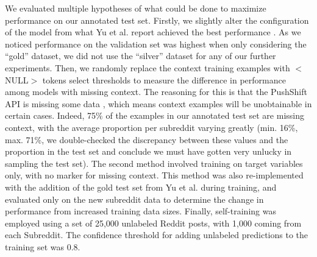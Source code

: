 \documentclass[10pt,twocolumn,letterpaper]{article}
\begin{document}

We evaluated multiple hypotheses of what could be done to maximize performance on our annotated test set. Firstly, we slightly alter the configuration of the model from what Yu et al. report achieved the best performance \cite{yu-etal-2022-hate}. As we noticed performance on the validation set was highest when only considering the ``gold'' dataset, we did not use the ``silver'' dataset for any of our further experiments. Then, we randomly replace the context training examples with $<$NULL$>$ tokens select thresholds to measure the difference in performance among models with missing context. The reasoning for this is that the PushShift API is missing some data \cite{gaffney2018caveat}, which means context examples will be unobtainable in certain cases. Indeed, 75\% of the examples in our annotated test set are missing context, with the average proportion per subreddit varying greatly (min. 16\%, max. 71\%, we double-checked the discrepancy between these values and the proportion in the test set and conclude we must have gotten very unlucky in sampling the test set). The second method involved training on target variables only, with no marker for missing context. This method was also re-implemented with the addition of the gold test set from Yu et al. \cite{yu-etal-2022-hate} during training, and evaluated only on the new subreddit data to determine the change in performance from increased training data sizes. Finally, self-training \cite{ruder2018strong} was employed using a set of 25,000 unlabeled Reddit posts, with 1,000 coming from each Subreddit. The confidence threshold for adding unlabeled predictions to the training set was 0.8.
\end{document}
